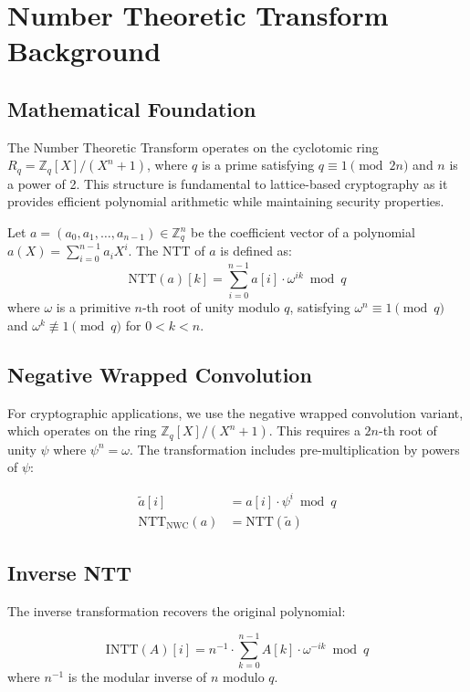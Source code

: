 \section{Number Theoretic Transform Background}


\subsection{Mathematical Foundation}

The Number Theoretic Transform operates on the cyclotomic ring $R_q = \mathbb{Z}_q[X]/(X^n + 1)$, where $q$ is a prime satisfying $q \equiv 1 \pmod{2n}$ and $n$ is a power of 2. This structure is fundamental to lattice-based cryptography as it provides efficient polynomial arithmetic while maintaining security properties.

\begin{definition}[NTT]
Let $a = (a_0, a_1, \ldots, a_{n-1}) \in \mathbb{Z}_q^n$ be the coefficient vector of a polynomial $a(X) = \sum_{i=0}^{n-1} a_i X^i$. The NTT of $a$ is defined as:
\[
\text{NTT}(a)[k] = \sum_{i=0}^{n-1} a[i] \cdot \omega^{ik} \bmod q
\]
where $\omega$ is a primitive $n$-th root of unity modulo $q$, satisfying $\omega^n \equiv 1 \pmod{q}$ and $\omega^k \not\equiv 1 \pmod{q}$ for $0 < k < n$.
\end{definition}

\subsection{Negative Wrapped Convolution}

For cryptographic applications, we use the negative wrapped convolution variant, which operates on the ring $\mathbb{Z}_q[X]/(X^n + 1)$. This requires a $2n$-th root of unity $\psi$ where $\psi^n = \omega$. The transformation includes pre-multiplication by powers of $\psi$:

\begin{align}
\tilde{a}[i] &= a[i] \cdot \psi^i \bmod q \\
\text{NTT}_{\text{NWC}}(a) &= \text{NTT}(\tilde{a})
\end{align}

\subsection{Inverse NTT}

The inverse transformation recovers the original polynomial:

\begin{definition}
\[
\text{INTT}(A)[i] = n^{-1} \cdot \sum_{k=0}^{n-1} A[k] \cdot \omega^{-ik} \bmod q
\]
where $n^{-1}$ is the modular inverse of $n$ modulo $q$.
\end{definition}

